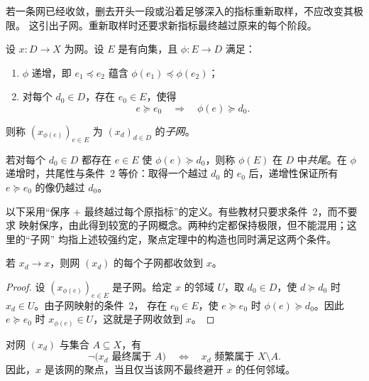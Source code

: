 若一条网已经收敛，删去开头一段或沿着足够深入的指标重新取样，不应改变其极限。
这引出子网。重新取样时还要求新指标最终越过原来的每个阶段。

\begin{definition}[子网]
设 \(x\colon D\to X\) 为网。设 \(E\) 是有向集，且
\(\phi\colon E\to D\) 满足：
\begin{enumerate}
  \item \(\phi\) 递增，即 \(e_1\preceq e_2\) 蕴含
        \(\phi(e_1)\preceq\phi(e_2)\)；
  \item 对每个 \(d_0\in D\)，存在 \(e_0\in E\)，使得
        \[
        e\succeq e_0\quad\Longrightarrow\quad \phi(e)\succeq d_0.
        \]
\end{enumerate}
则称 \((x_{\phi(e)})_{e\in E}\) 为 \((x_d)_{d\in D}\) 的\emph{子网}。

若对每个 \(d_0\in D\) 都存在 \(e\in E\) 使 \(\phi(e)\succeq d_0\)，则称
\(\phi(E)\) 在 \(D\) 中\emph{共尾}。在 \(\phi\) 递增时，共尾性与条件~2
等价：取得一个越过 \(d_0\) 的 \(e_0\) 后，递增性保证所有
\(e\succeq e_0\) 的像仍越过 \(d_0\)。
\end{definition}

\begin{remark}[子网定义的两种约定]
以下采用“保序 $+$ 最终越过每个原指标”的定义。有些教材只要求条件~2，而不要求
映射保序，由此得到较宽的子网概念。两种约定都保持极限，但不能混用；这里的“子网”
均指上述较强约定，聚点定理中的构造也同时满足这两个条件。
\end{remark}

\begin{lemma}[子网保持极限]
若 \(x_d\to x\)，则网 \((x_d)\) 的每个子网都收敛到 \(x\)。
\label{ch1:lem:subnet-limit}
\end{lemma}

\begin{proof}
设 \((x_{\phi(e)})_{e\in E}\) 是子网。给定 \(x\) 的邻域 \(U\)，取
\(d_0\in D\)，使 \(d\succeq d_0\) 时 \(x_d\in U\)。由子网映射的条件~2，
存在 \(e_0\in E\)，使 \(e\succeq e_0\) 时 \(\phi(e)\succeq d_0\)。因此
\(e\succeq e_0\) 时 \(x_{\phi(e)}\in U\)，这就是子网收敛到 \(x\)。
\end{proof}

\begin{lemma}[最终与频繁的否定关系]
对网 \((x_d)\) 与集合 \(A\subseteq X\)，有
\[
 \neg\bigl(x_d\text{ 最终属于 }A\bigr)
 \quad\Longleftrightarrow\quad
 x_d\text{ 频繁属于 }X\setminus A.
\]
因此，\(x\) 是该网的聚点，当且仅当该网不最终避开 \(x\) 的任何邻域。
\label{ch1:lem:eventually-frequently}
\end{lemma}


